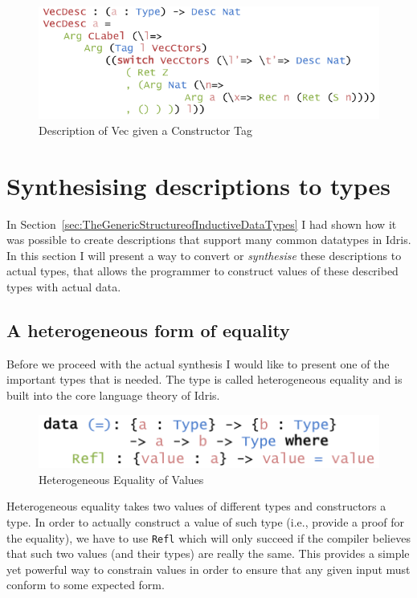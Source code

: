 \documentclass{ituthesis}
\newcommand{\ttconstructor}[1]{\textcolor{constructor-color}{\texttt{#1}}}
\begin{document}
\begin{figure}[H]
\begin{center}
    \includegraphics[scale=0.5]{Figures/VectorDescriptionImproved.png}
\end{center}
\caption{Description of Vec given a Constructor Tag}
\label{fig:vecdescim}
\end{figure}

\section{Synthesising descriptions to types}
\label{sec:SynthesisingDescriptionstoTypes}
In Section~\ref{sec:TheGenericStructureofInductiveDataTypes} I had shown how it was possible to create descriptions that support many common datatypes in Idris.
In this section I will present a way to convert or \textit{synthesise} these descriptions to actual types, that allows the programmer to construct values of these described types with actual data.

\subsection{A heterogeneous form of equality}
\label{sub:AHeterogeneousFormofEquality}
Before we proceed with the actual synthesis I would like to present one of the important types that is needed.
The type is called heterogeneous equality and is built into the core language theory of Idris.
\begin{figure}[ht]
\begin{center}
    \includegraphics[scale=0.5]{Figures/HeterogeneousEquality.png}
\end{center}
\caption{Heterogeneous Equality of Values}
\label{fig:heteq}
\end{figure}
Heterogeneous equality takes two values of different types and constructors a type.
In order to actually construct a value of such type (i.e., provide a proof for the equality), we have to use \ttconstructor{Refl} which will only succeed if the compiler believes that such two values (and their types) are really the same.
This provides a simple yet powerful way to constrain values in order to ensure that any given input must conform to some expected form.
\end{document}
